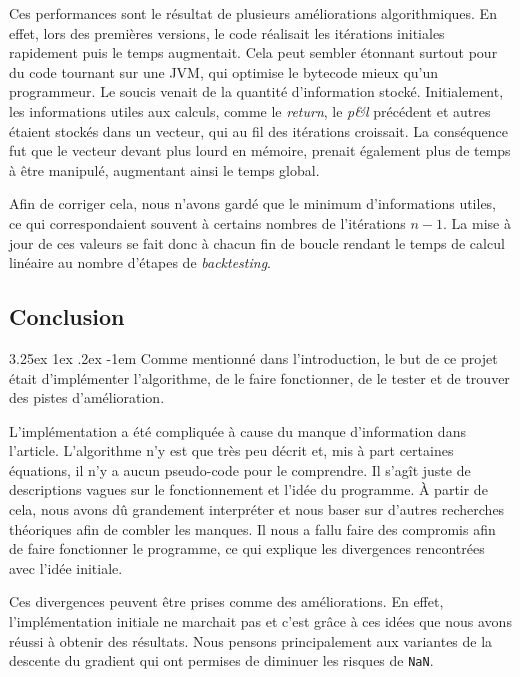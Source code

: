\documentclass[a4paper, 11pt]{article}
\makeatletter
\renewcommand\paragraph{\@startsection{paragraph}{5}{\z@}%
  {3.25ex \@plus1ex \@minus.2ex}%
  {-1em}%
  {\normalfont\normalsize\bfseries}}
\makeatother
\begin{document}
Ces performances sont le résultat de plusieurs améliorations algorithmiques. En effet, lors des premières versions, le code réalisait les itérations initiales rapidement puis le temps augmentait. Cela peut sembler étonnant surtout pour du code tournant sur une JVM, qui optimise le bytecode mieux qu'un programmeur. Le soucis venait de la quantité d'information stocké. Initialement, les informations utiles aux calculs, comme le \textit{return}, le \textit{p\&l} précédent et autres étaient stockés dans un vecteur, qui au fil des itérations croissait. La conséquence fut que le vecteur devant plus lourd en mémoire, prenait également plus de temps à être manipulé, augmentant ainsi le temps global.

Afin de corriger cela, nous n'avons gardé que le minimum d'informations utiles, ce qui correspondaient souvent à certains nombres de l'itérations $n-1$. La mise à jour de ces valeurs se fait donc à chacun fin de boucle rendant le temps de calcul linéaire au nombre d'étapes de \textit{backtesting}.
 
\subsection{Conclusion}
\paragraph{}
Comme mentionné dans l'introduction, le but de ce projet était d'implémenter l'algorithme, de le faire fonctionner, de le tester et de trouver des pistes
d'amélioration.

L'implémentation a été compliquée à cause du manque d'information dans l'article. L'algorithme n'y est que très peu décrit et, mis à part certaines 
équations, il n'y a aucun pseudo-code pour le comprendre. Il s'agît juste de descriptions vagues sur le fonctionnement et l'idée du programme. À partir de
cela, nous avons dû grandement interpréter et nous baser sur d'autres recherches théoriques afin de combler les manques. Il nous a fallu faire des compromis
afin de faire fonctionner le programme, ce qui explique les divergences rencontrées avec l'idée initiale.

Ces divergences peuvent être prises comme des améliorations. En effet, l'implémentation initiale ne marchait pas et c'est grâce à ces idées que nous avons
réussi à obtenir des résultats. Nous pensons principalement aux variantes de la descente du gradient qui ont permises de diminuer les risques de
\texttt{NaN}.
\end{document}
